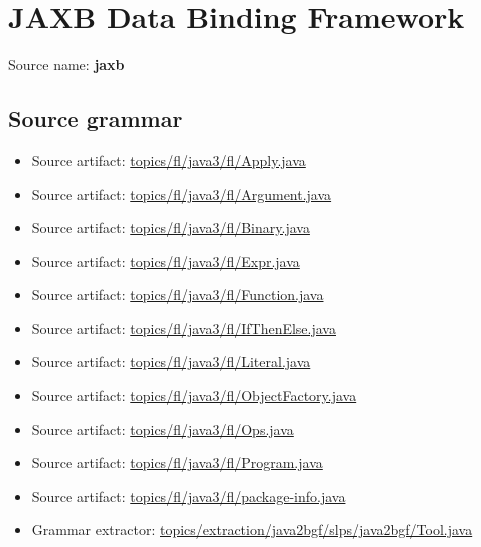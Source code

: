 \chapter{JAXB Data Binding Framework}

 Source name: \textbf{jaxb}

\section{Source grammar}

\begin{itemize}\item Source artifact: \href{http://github.com/grammarware/slps/blob/master/topics/fl/java3/fl/Apply.java}{topics/fl/java3/fl/Apply.java}\item Source artifact: \href{http://github.com/grammarware/slps/blob/master/topics/fl/java3/fl/Argument.java}{topics/fl/java3/fl/Argument.java}\item Source artifact: \href{http://github.com/grammarware/slps/blob/master/topics/fl/java3/fl/Binary.java}{topics/fl/java3/fl/Binary.java}\item Source artifact: \href{http://github.com/grammarware/slps/blob/master/topics/fl/java3/fl/Expr.java}{topics/fl/java3/fl/Expr.java}\item Source artifact: \href{http://github.com/grammarware/slps/blob/master/topics/fl/java3/fl/Function.java}{topics/fl/java3/fl/Function.java}\item Source artifact: \href{http://github.com/grammarware/slps/blob/master/topics/fl/java3/fl/IfThenElse.java}{topics/fl/java3/fl/IfThenElse.java}\item Source artifact: \href{http://github.com/grammarware/slps/blob/master/topics/fl/java3/fl/Literal.java}{topics/fl/java3/fl/Literal.java}\item Source artifact: \href{http://github.com/grammarware/slps/blob/master/topics/fl/java3/fl/ObjectFactory.java}{topics/fl/java3/fl/ObjectFactory.java}\item Source artifact: \href{http://github.com/grammarware/slps/blob/master/topics/fl/java3/fl/Ops.java}{topics/fl/java3/fl/Ops.java}\item Source artifact: \href{http://github.com/grammarware/slps/blob/master/topics/fl/java3/fl/Program.java}{topics/fl/java3/fl/Program.java}\item Source artifact: \href{http://github.com/grammarware/slps/blob/master/topics/fl/java3/fl/package-info.java}{topics/fl/java3/fl/package-info.java}\item Grammar extractor: \href{http://github.com/grammarware/slps/blob/master/topics/extraction/java2bgf/slps/java2bgf/Tool.java}{topics/extraction/java2bgf/slps/java2bgf/Tool.java}\end{itemize}

